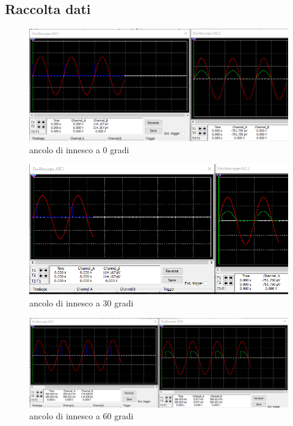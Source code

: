 \documentclass[12pt]{article}
\begin{document}
\subsection{Raccolta dati}
\begin{center}
\begin{figure}[H]
   \caption{ancolo di innesco a 0 gradi}
   \includegraphics[scale=0.7]{Grafico 0.PNG}
\end{figure}


\begin{figure}[H]
\caption{ancolo di innesco a 30 gradi}
\includegraphics[scale=0.7]{Grafico 30.PNG}
\end{figure}


\begin{figure}[H]
\caption{ancolo di innesco a 60 gradi}
\includegraphics[scale=0.7]{Grafico 60.PNG}
\end{figure}


\end{center}
\end{document}
